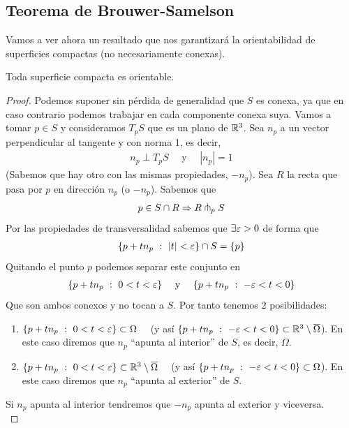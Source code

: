 \subsection{Teorema de Brouwer-Samelson}

Vamos a ver ahora un resultado que nos garantizará la orientabilidad de superficies compactas (no necesariamente conexas).

\begin{teo}\label{teo:brouwer_samelson}
    Toda superficie compacta es orientable.

    \begin{proof}
        Podemos suponer sin pérdida de generalidad que $S$ es conexa, ya que en caso contrario podemos trabajar en cada componente conexa suya.
        Vamos a tomar $p\in S$ y consideramos $T_pS$ que es un plano de $\mathbb{R}^3$. Sea $n_p$ a un vector perpendicular al tangente y con norma 1, es decir,
        \begin{gather*}
            n_p \perp T_pS \quad \text{ y } \quad |n_p|=1 
        \end{gather*}
        (Sabemos que hay otro con las mismas propiedades, $-n_p$). Sea $R$ la recta que pasa por $p$ en dirección $n_p$ (o $-n_p$). Sabemos que 
        \begin{gather*}
            p\in S\cap R \Rightarrow R \pitchfork_p S
        \end{gather*}
        Por las propiedades de transversalidad sabemos que $\exists \varepsilon>0$ de forma que 
        \begin{gather*}
            \{p+tn_p \ : \ |t|<\varepsilon\}\cap S = \{p\}
        \end{gather*}
        Quitando el punto $p$ podemos separar este conjunto en 
        \begin{gather*}
            \{p+tn_p \ : \ 0<t<\varepsilon\} \quad \text{ y } \quad \{p+tn_p \ : \ -\varepsilon<t<0\}
        \end{gather*}
        Que son ambos conexos y no tocan a $S$. Por tanto tenemos 2 posibilidades:
        \begin{enumerate}
            \item $\{p+tn_p \ : \ 0<t<\varepsilon\} \subset \Omega \quad$ (y así $\{p+tn_p \ : \ -\varepsilon<t<0\}\subset \mathbb{R}^3 \setminus \overline{\Omega}$). En este caso diremos que $n_p$ ``apunta al interior'' de $S$, es decir, $\Omega$.
            \item $\{p+tn_p \ : \ 0<t<\varepsilon\} \subset \mathbb{R}^3 \setminus \overline{\Omega} \quad$ (y así $\{p+tn_p \ : \ -\varepsilon<t<0\}\subset \Omega$). En este caso diremos que $n_p$ ``apunta al exterior'' de $S$.
        \end{enumerate}
        Si $n_p$ apunta al interior tendremos que $-n_p$ apunta al exterior y viceversa.\\


\end{proof}
\end{teo}
